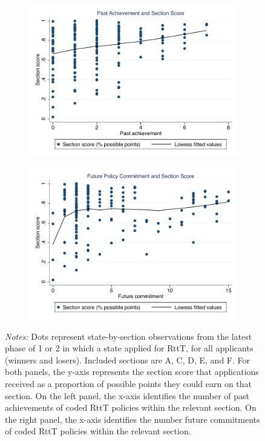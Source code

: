 \documentclass[12pt]{article}
\begin{document}
\begin{figure}[h!]
\caption*{\bf Figure 1. Section scores, by Prior Achievement and Future Commitment.}
\centering
    \begin{subfigure}[b]{0.4\textwidth}
        \includegraphics[width=\textwidth]{scatter7.pdf}
    \end{subfigure}
    \begin{subfigure}[b]{0.4\textwidth}
        \includegraphics[width=\textwidth]{scatter8.pdf}
    \end{subfigure}
\begin{minipage}{\textwidth} 
\vspace{2mm}
\begin{singlespace}
{\footnotesize \textit{Notes:} Dots represent state-by-section observations from the latest phase of 1 or 2 in which a state applied for RttT, for all applicants (winners and losers). Included sections are A, C, D, E, and F. For both panels, the y-axis represents the section score that applications received as a proportion of possible points they could earn on that section. On the left panel, the x-axis identifies the number of past achievements of coded RttT policies within the relevant section. On the right panel, the x-axis identifies the number future commitments of coded RttT policies within the relevant section.}
\end{singlespace}
\end{minipage}
\end{figure}
\end{document}
